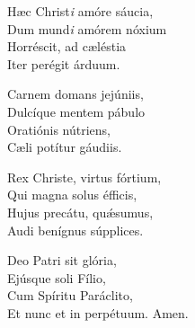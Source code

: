 Hæc Christ\textit{i} amóre sáucia,\\
Dum mund\textit{i} amórem nóxium\\
Horréscit, ad cæléstia\\
Iter perégit árduum.

Carnem domans jejúniis,\\
Dulcíque mentem pábulo\\
Oratiónis nútriens,\\
Cæli potítur gáudiis.

Rex Christe, virtus fórtium,\\
Qui magna solus éfficis,\\
Hujus precátu, quǽsumus,\\
Audi benígnus súpplices.

Deo Patri sit glória,\\
Ejúsque soli Fílio,\\
Cum Spíritu Paráclito,\\
Et nunc et in perpétuum. Amen.
